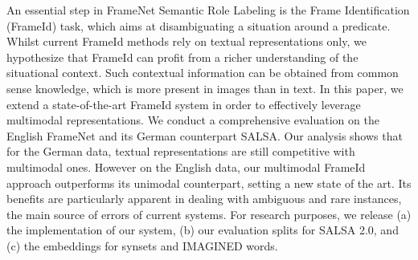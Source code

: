 An essential step in FrameNet Semantic Role Labeling is the Frame Identification (FrameId) task, which aims at disambiguating a situation around a predicate. Whilst current FrameId methods rely on textual representations only, we hypothesize that FrameId can profit from a richer understanding of the situational context. Such contextual information can be obtained from common sense knowledge, which is more present in images than in text. In this paper, we extend a state-of-the-art FrameId system in order to effectively leverage multimodal representations. We conduct a comprehensive evaluation on the English FrameNet and its German counterpart SALSA. Our analysis shows that for the German data, textual representations are still competitive with multimodal ones. However on the English data, our multimodal FrameId approach outperforms its unimodal counterpart, setting a new state of the art. Its benefits are particularly apparent in dealing with ambiguous and rare instances, the main source of errors of current systems. For research purposes, we release (a) the implementation of our system, (b) our evaluation splits for SALSA 2.0, and (c) the embeddings for synsets and IMAGINED words.
